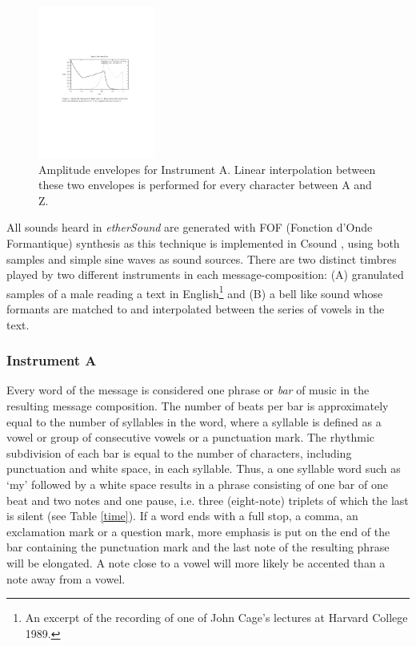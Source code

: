 \begin{figure}[!hbp]
  \centering
  \includegraphics[trim=40mm 120mm 0mm 80mm, clip, height=50mm]{img/ethsnd/envelope}
  \caption{Amplitude envelopes for Instrument A. Linear interpolation
    between these two envelopes is performed for every character
    between A and Z.}
  \label{fig:envelope}
\end{figure}

All sounds heard in \emph{etherSound} are generated with FOF (Fonction d'Onde Formantique) synthesis as this technique is implemented in Csound \citep{fof,fof2}, using both samples and simple sine waves as sound sources. There are two distinct timbres played by two different instruments in each message-composition: (A) granulated samples of a male reading a text in English\footnote{An excerpt of the recording of   one of John Cage's lectures at Harvard College 1989.} and (B) a bell like sound whose formants are matched to and interpolated between the series of vowels in the text.  

\subsubsection{Instrument A} Every word of the message is considered one phrase or \emph{bar} of music in the resulting message composition. The number of beats per bar is approximately equal to the number of syllables in the word, where a syllable is defined as a vowel or group of consecutive vowels or a punctuation mark. The rhythmic subdivision of each bar is equal to the number of characters, including punctuation and white space, in each syllable. Thus, a one syllable word such as `my' followed by a white space results in a phrase consisting of one bar of one beat and two notes and one pause, i.e. three (eight-note) triplets of which the last is silent (see Table \ref{time}). If a word ends with a full stop, a comma, an exclamation mark or a question mark, more emphasis is put on the end of the bar containing the punctuation mark and the last note of the resulting phrase will be elongated. A note close to a vowel will more likely be accented than a note away from a vowel. 


